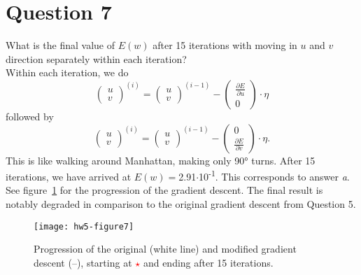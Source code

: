 \documentclass[	11pt,
				a4paper,
				twoside,
				titlepage,
				bibtotoc,
				openright,
				cleardoublepage=empty
				]{scrartcl}
\begin{document}
\section{Question 7} %
What is the final value of $E(w)$ after 15 iterations with moving in $u$ and $v$ direction separately within each iteration?\\

Within each iteration, we do
\begin{equation}
\left(\begin{smallmatrix}u\\v\end{smallmatrix}\right)^{(i)} = \left(\begin{smallmatrix}u\\v\end{smallmatrix}\right)^{(i-1)} - \left(\begin{smallmatrix}\frac{\partial{E}}{\partial{u}}\\0\end{smallmatrix}\right) \cdot \eta
\end{equation}
followed by 
\begin{equation}
\left(\begin{smallmatrix}u\\v\end{smallmatrix}\right)^{(i)} = \left(\begin{smallmatrix}u\\v\end{smallmatrix}\right)^{(i-1)} - \left(\begin{smallmatrix}0\\\frac{\partial{E}}{\partial{v}}\end{smallmatrix}\right) \cdot \eta.
\end{equation}
This is like walking around Manhattan, making only 90° turns.
After 15 iterations, we have arrived at $E(w) = $2.91$\cdot$10\textsuperscript{-1}. This corresponds to answer \emph{a}. See figure~\ref{fig:7} for the progression of the gradient descent. The final result is notably degraded in comparison to the original gradient descent from Question 5.
\begin{figure}[!h]
	\texttt{[image: hw5-figure7]}
	\caption{Progression of the original (white line) and modified gradient descent (\textcolor{bottlegreen}{--}), starting at \textcolor{red}{$\star$} and ending after 15 iterations.}
	\label{fig:7}
\end{figure}
\end{document}
